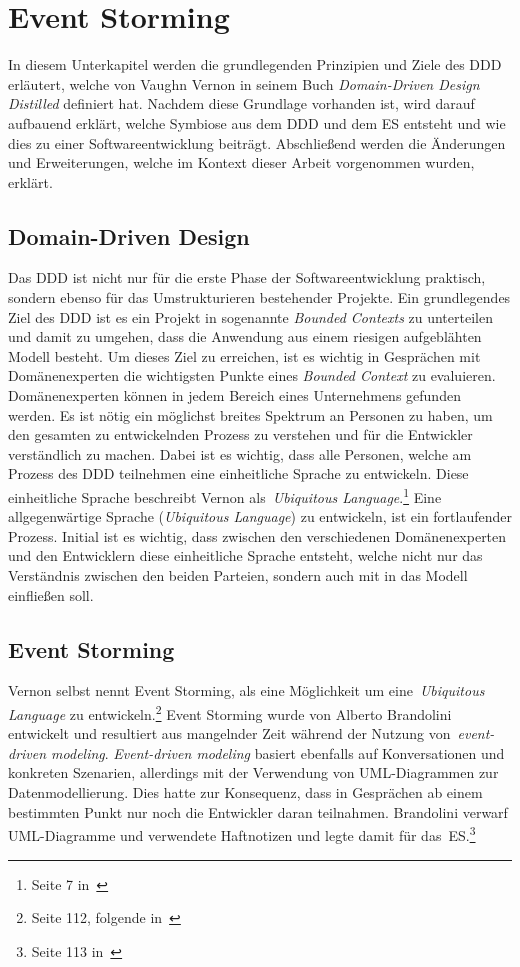 \section{Event Storming}\label{sec:event-storming}
In diesem Unterkapitel werden die grundlegenden Prinzipien und Ziele des \ac{DDD} erläutert, welche von Vaughn Vernon in seinem Buch
\textit{Domain-Driven Design Distilled} definiert hat.\cite*{dddd}
Nachdem diese Grundlage vorhanden ist, wird darauf aufbauend erklärt, welche Symbiose aus dem \ac{DDD} und dem \ac{ES} entsteht und wie
dies zu einer Softwareentwicklung beiträgt.
Abschließend werden die Änderungen und Erweiterungen, welche im Kontext dieser Arbeit vorgenommen wurden, erklärt.

\subsection{Domain-Driven Design}\label{subsec:domain-driven-design}
Das \ac*{DDD} ist nicht nur für die erste Phase der Softwareentwicklung praktisch, sondern ebenso für das Umstrukturieren bestehender Projekte.
Ein grundlegendes Ziel des \ac{DDD} ist es ein Projekt in sogenannte \textit{Bounded Contexts} zu unterteilen und damit zu umgehen, dass
die Anwendung aus einem riesigen aufgeblähten Modell besteht.
Um dieses Ziel zu erreichen, ist es wichtig in Gesprächen mit Domänenexperten die wichtigsten Punkte eines \textit{Bounded Context} zu evaluieren.
Domänenexperten können in jedem Bereich eines Unternehmens gefunden werden.
Es ist nötig ein möglichst breites Spektrum an Personen zu haben, um den gesamten zu entwickelnden Prozess zu verstehen und für die Entwickler verständlich zu machen.
Dabei ist es wichtig, dass alle Personen, welche am Prozess des \ac{DDD} teilnehmen eine einheitliche Sprache zu entwickeln.
Diese einheitliche Sprache beschreibt Vernon als~\textit{Ubiquitous Language}.\footnote{Seite 7 in~\cite*{dddd}}
Eine allgegenwärtige Sprache (\textit{Ubiquitous Language}) zu entwickeln, ist ein fortlaufender Prozess.
Initial ist es wichtig, dass zwischen den verschiedenen Domänenexperten und den Entwicklern diese einheitliche Sprache entsteht, welche
nicht nur das Verständnis zwischen den beiden Parteien, sondern auch mit in das Modell einfließen soll.

\subsection{Event Storming}\label{subsec:allgemein}
Vernon selbst nennt Event Storming, als eine Möglichkeit um eine~\textit{Ubiquitous Language} zu entwickeln.\footnote{Seite 112, folgende in~\cite*{dddd}}
Event Storming wurde von Alberto Brandolini entwickelt und resultiert aus mangelnder Zeit während der Nutzung von~\textit{event-driven modeling}.
\textit{Event-driven modeling} basiert ebenfalls auf Konversationen und konkreten Szenarien, allerdings mit der Verwendung von UML-Diagrammen zur Datenmodellierung.
Dies hatte zur Konsequenz, dass in Gesprächen ab einem bestimmten Punkt nur noch die Entwickler daran teilnahmen.
Brandolini verwarf UML-Diagramme und verwendete Haftnotizen und legte damit für das~\ac{ES}.\footnote{Seite 113 in~\cite*{dddd}}

